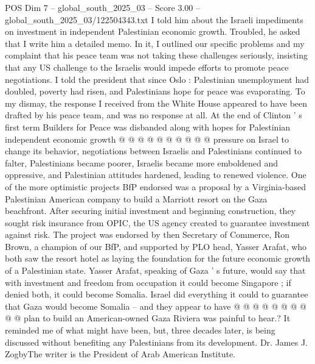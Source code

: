 \begin{textsample}{POS Dim 7 – global\_south\_2025\_03 – Score 3.00 – global\_south\_2025\_03/122504343.txt}
I told him about the Israeli impediments on investment in independent Palestinian economic growth.
Troubled, he asked that I write him a detailed memo.
In it, I outlined our specific problems and my complaint that his peace team was not taking these challenges seriously, insisting that any US challenge to the Israelis would impede efforts to promote peace negotiations.
I told the president that since Oslo : Palestinian unemployment had doubled, poverty had risen, and Palestinians hope for peace was evaporating.
To my dismay, the response I received from the White House appeared to have been drafted by his peace team, and was no response at all.
At the end of Clinton ' s first term Builders for Peace was disbanded along with hopes for Palestinian independent economic growth @ @ @ @ @ @ @ @ @ @ pressure on Israel to change its behavior, negotiations between Israelis and Palestinians continued to falter, Palestinians became poorer, Israelis became more emboldened and oppressive, and Palestinian attitudes hardened, leading to renewed violence.
One of the more optimistic projects BfP endorsed was a proposal by a Virginia-based Palestinian American company to build a Marriott resort on the Gaza beachfront.
After securing initial investment and beginning construction, they sought risk insurance from OPIC, the US agency created to guarantee investment against risk.
The project was endorsed by then Secretary of Commerce, Ron Brown, a champion of our BfP, and supported by PLO head, Yasser Arafat, who both saw the resort hotel as laying the foundation for the future economic growth of a Palestinian state.
Yasser Arafat, speaking of Gaza ' s future, would say that with investment and freedom from occupation it could become Singapore ; if denied both, it could become Somalia.
Israel did everything it could to guarantee that Gaza would become Somalia -- and they appear to have @ @ @ @ @ @ @ @ @ @ plan to build an American-owned Gaza Riviera was painful to hear.?
It reminded me of what might have been, but, three decades later, is being discussed without benefiting any Palestinians from its development.
Dr.
James J.
ZogbyThe writer is the President of Arab American Institute.

\end{textsample}
